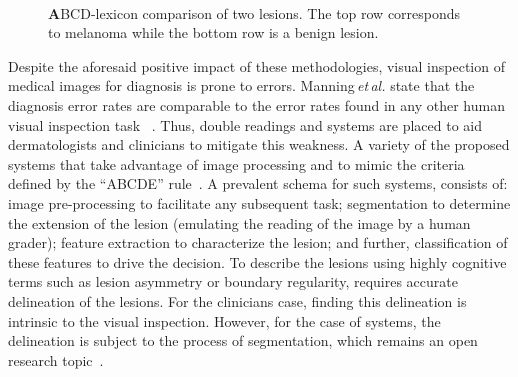 \begin{figure}
\begin{center}
    \hfill
    \hfill
    \hfill
  \hspace*{\fill}\\
    \caption{{\textbf ABCD}-lexicon comparison of two lesions. The top row corresponds to melanoma while the bottom row is a benign lesion.}
  \label{fig:lexicon}
\end{center}
\end{figure}

Despite the aforesaid positive impact of these methodologies, visual inspection of medical images for diagnosis is prone to errors.
Manning\,\emph{et\,al.} state that the diagnosis error rates are comparable to the error rates found in any other human visual inspection task ~\cite{manning2014perception}.
Thus, double readings and \cad systems are placed to aid dermatologists and clinicians to mitigate this weakness.
A variety of the proposed \cad systems that take advantage of image processing and \ml to mimic the criteria defined by the ``ABCDE'' rule~\cite{rastgoo2015automatic}.
A prevalent schema for such \cad systems, consists of: image pre-processing to facilitate any subsequent task; segmentation to determine the extension of the lesion (emulating the reading of the image by a human grader); feature extraction to characterize the lesion; and further, classification of these features to drive the decision.
To describe the lesions using highly cognitive terms such as lesion asymmetry or boundary regularity, requires accurate delineation of the lesions. For the clinicians case, finding this delineation is intrinsic to the visual inspection. However, for the case of \cad systems, the delineation is subject to the process of segmentation, which remains an open research topic~\cite{duncan2000medical}.

